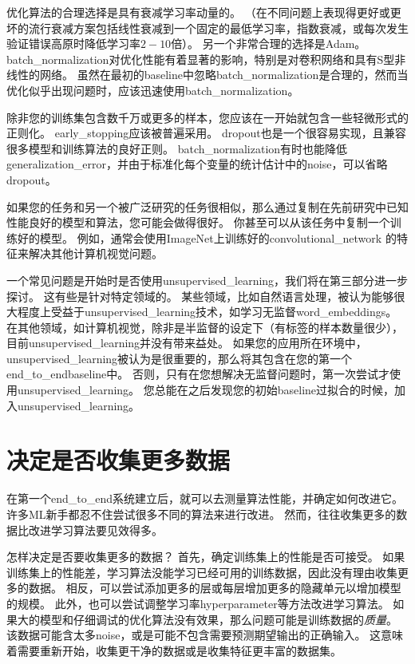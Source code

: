 优化算法的合理选择是具有衰减学习率动量的。
（在不同问题上表现得更好或更坏的流行衰减方案包括线性衰减到一个固定的最低学习率，指数衰减，或每次发生验证错误高原时降低学习率$2-10$倍）。
另一个非常合理的选择是Adam。
\gls{batch_normalization}对优化性能有着显著的影响，特别是对卷积网络和具有S型非线性的网络。
虽然在最初的\gls{baseline}中忽略\gls{batch_normalization}是合理的，然而当优化似乎出现问题时，应该迅速使用\gls{batch_normalization}。

除非您的训练集包含数千万或更多的样本，您应该在一开始就包含一些轻微形式的正则化。 
\gls{early_stopping}应该被普遍采用。
\gls{dropout}也是一个很容易实现，且兼容很多模型和训练算法的良好正则。
\gls{batch_normalization}有时也能降低\gls{generalization_error}，并由于标准化每个变量的统计估计中的\gls{noise}，可以省略\gls{dropout}。


如果您的任务和另一个被广泛研究的任务很相似，那么通过复制在先前研究中已知性能良好的模型和算法，您可能会做得很好。
你甚至可以从该任务中复制一个训练好的模型。
例如，通常会使用ImageNet上训练好的\gls{convolutional_network} 的特征来解决其他计算机视觉问题\citep{girshickregion}。

一个常见问题是开始时是否使用\gls{unsupervised_learning}，我们将在第三部分进一步探讨。
这有些是针对特定领域的。
某些领域，比如自然语言处理，被认为能够很大程度上受益于\gls{unsupervised_learning}技术，如学习无监督\gls{word_embeddings}。
在其他领域，如计算机视觉，除非是半监督的设定下（有标签的样本数量很少）\citep{Kingma-et-al-NIPS2014,Rasmus-et-al-arxiv2015}，目前\gls{unsupervised_learning}并没有带来益处。
如果您的应用所在环境中，\gls{unsupervised_learning}被认为是很重要的，那么将其包含在您的第一个\gls{end_to_end}\gls{baseline}中。
否则，只有在您想解决无监督问题时，第一次尝试才使用\gls{unsupervised_learning}。
您总能在之后发现您的初始\gls{baseline}过拟合的时候，加入\gls{unsupervised_learning}。

\section{决定是否收集更多数据}
\label{sec:determining_whether_to_gather_more_data}
在第一个\gls{end_to_end}系统建立后，就可以去测量算法性能，并确定如何改进它。
许多\gls{ML}新手都忍不住尝试很多不同的算法来进行改进。
然而，往往收集更多的数据比改进学习算法要见效得多。

怎样决定是否要收集更多的数据？
首先，确定训练集上的性能是否可接受。
如果训练集上的性能差，学习算法没能学习已经可用的训练数据，因此没有理由收集更多的数据。
相反，可以尝试添加更多的层或每层增加更多的隐藏单元以增加模型的规模。
此外，也可以尝试调整学习率\gls{hyperparameter}等方法改进学习算法。
如果大的模型和仔细调试的优化算法没有效果，那么问题可能是训练数据的\emph{质量}。
该数据可能含太多\gls{noise}，或是可能不包含需要预测期望输出的正确输入。
这意味着需要重新开始，收集更干净的数据或是收集特征更丰富的数据集。

